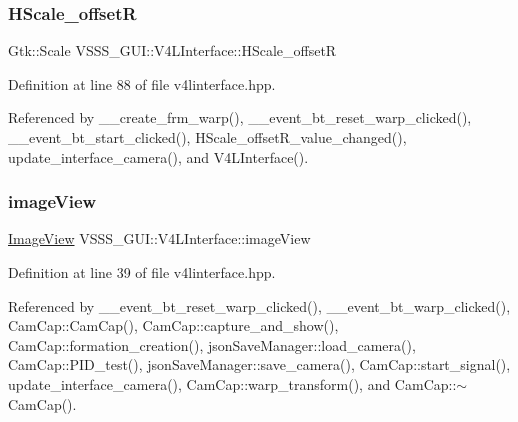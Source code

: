 \mbox{\label{class_v_s_s_s___g_u_i_1_1_v4_l_interface_a50fa202e4b9ec95b2c009a324aea10fb}} 
\subsubsection{\texorpdfstring{H\+Scale\+\_\+offsetR}{HScale\_offsetR}}
{\footnotesize\ttfamily Gtk\+::\+Scale V\+S\+S\+S\+\_\+\+G\+U\+I\+::\+V4\+L\+Interface\+::\+H\+Scale\+\_\+offsetR}



Definition at line 88 of file v4linterface.\+hpp.



Referenced by \+\_\+\+\_\+create\+\_\+frm\+\_\+warp(), \+\_\+\+\_\+event\+\_\+bt\+\_\+reset\+\_\+warp\+\_\+clicked(), \+\_\+\+\_\+event\+\_\+bt\+\_\+start\+\_\+clicked(), H\+Scale\+\_\+offset\+R\+\_\+value\+\_\+changed(), update\+\_\+interface\+\_\+camera(), and V4\+L\+Interface().

\mbox{\label{class_v_s_s_s___g_u_i_1_1_v4_l_interface_a2c99f4d9fad8a34fa98d5b61beb06745}} 
\subsubsection{\texorpdfstring{image\+View}{imageView}}
{\footnotesize\ttfamily \hyperlink{class_image_view}{Image\+View} V\+S\+S\+S\+\_\+\+G\+U\+I\+::\+V4\+L\+Interface\+::image\+View}



Definition at line 39 of file v4linterface.\+hpp.



Referenced by \+\_\+\+\_\+event\+\_\+bt\+\_\+reset\+\_\+warp\+\_\+clicked(), \+\_\+\+\_\+event\+\_\+bt\+\_\+warp\+\_\+clicked(), Cam\+Cap\+::\+Cam\+Cap(), Cam\+Cap\+::capture\+\_\+and\+\_\+show(), Cam\+Cap\+::formation\+\_\+creation(), json\+Save\+Manager\+::load\+\_\+camera(), Cam\+Cap\+::\+P\+I\+D\+\_\+test(), json\+Save\+Manager\+::save\+\_\+camera(), Cam\+Cap\+::start\+\_\+signal(), update\+\_\+interface\+\_\+camera(), Cam\+Cap\+::warp\+\_\+transform(), and Cam\+Cap\+::$\sim$\+Cam\+Cap().

